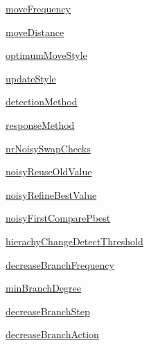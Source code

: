 \begin{CompactItemize}
\hyperlink{classpsoParameter_1_1PsoParameter3_b2baaa78aef306aa15281b936a66cc03}{moveFrequency}
\item 
\hyperlink{classpsoParameter_1_1PsoParameter3_553e82a281235d1231aa709bf40caa57}{moveDistance}
\item 
\hyperlink{classpsoParameter_1_1PsoParameter3_9ea957157311b4a41c72c5a7753244d6}{optimumMoveStyle}
\item 
\hyperlink{classpsoParameter_1_1PsoParameter3_93a2bc101aad0ea91f5dba975b26c1ef}{updateStyle}
\item 
\hyperlink{classpsoParameter_1_1PsoParameter3_099e54276f4a957e5303423b143320bd}{detectionMethod}
\item 
\hyperlink{classpsoParameter_1_1PsoParameter3_ec5876fa2d3308db4c2e654428f0ca4e}{responseMethod}
\item 
\hyperlink{classpsoParameter_1_1PsoParameter3_fc3ebbc7be519025ced53d3e0e98de1f}{nrNoisySwapChecks}
\item 
\hyperlink{classpsoParameter_1_1PsoParameter3_f24856ff9d6e08181601a7fb950f9e2a}{noisyReuseOldValue}
\item 
\hyperlink{classpsoParameter_1_1PsoParameter3_41830dcf7b995bd3e38f26bc802341f5}{noisyRefineBestValue}
\item 
\hyperlink{classpsoParameter_1_1PsoParameter3_05f9c4a08164f571d96df5ba94e30b2b}{noisyFirstComparePbest}
\item 
\hyperlink{classpsoParameter_1_1PsoParameter3_ad18ba845b67ab423baffd3fb42c7ebe}{hierachyChangeDetectThreshold}
\item 
\hyperlink{classpsoParameter_1_1PsoParameter3_d3eb69fe53e8d5677506e3a7f558df48}{decreaseBranchFrequency}
\item 
\hyperlink{classpsoParameter_1_1PsoParameter3_d761d7f892e114ad3ccf8f992b4b67c0}{minBranchDegree}
\item 
\hyperlink{classpsoParameter_1_1PsoParameter3_35d74394c939733119ead12a0ff84059}{decreaseBranchStep}
\item 
\hyperlink{classpsoParameter_1_1PsoParameter3_69978cf1cf9314c9eda9695e6edeb55a}{decreaseBranchAction}
\end{CompactItemize}
